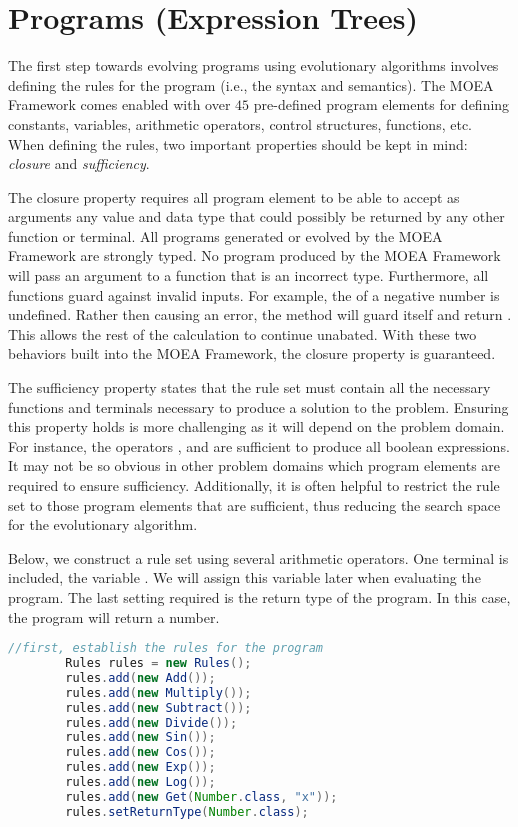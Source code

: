 \section{Programs (Expression Trees)}
The first step towards evolving programs using evolutionary algorithms involves defining the rules for the program (i.e., the syntax and semantics).  The MOEA Framework comes enabled with over $45$ pre-defined program elements for defining constants, variables, arithmetic operators, control structures, functions, etc.  When defining the rules, two important properties should be kept in mind: \emph{closure} and \emph{sufficiency}.

The closure property requires all program element to be able to accept as arguments any value and data type that could possibly be returned by any other function or terminal.  All programs generated or evolved by the MOEA Framework are strongly typed.  No program produced by the MOEA Framework will pass an argument to a function that is an incorrect type.  Furthermore, all functions guard against invalid inputs.  For example, the  of a negative number is undefined.  Rather then causing an error, the  method will guard itself and return .  This allows the rest of the calculation to continue unabated.  With these two behaviors built into the MOEA Framework, the closure property is guaranteed.

The sufficiency property states that the rule set must contain all the necessary functions and terminals necessary to produce a solution to the problem.  Ensuring this property holds is more challenging as it will depend on the problem domain.  For instance, the operators ,  and  are sufficient to produce all boolean expressions.  It may not be so obvious in other problem domains which program elements are required to ensure sufficiency.  Additionally, it is often helpful to restrict the rule set to those program elements that are sufficient, thus reducing the search space for the evolutionary algorithm.

Below, we construct a rule set using several arithmetic operators.  One terminal is included, the variable .  We will assign this variable later when evaluating the program.  The last setting required is the return type of the program.  In this case, the program will return a number.
\begin{lstlisting}[language=Java]
    //first, establish the rules for the program
		Rules rules = new Rules();
		rules.add(new Add());
		rules.add(new Multiply());
		rules.add(new Subtract());
		rules.add(new Divide());
		rules.add(new Sin());
		rules.add(new Cos());
		rules.add(new Exp());
		rules.add(new Log());
		rules.add(new Get(Number.class, "x"));
		rules.setReturnType(Number.class);
\end{lstlisting}

